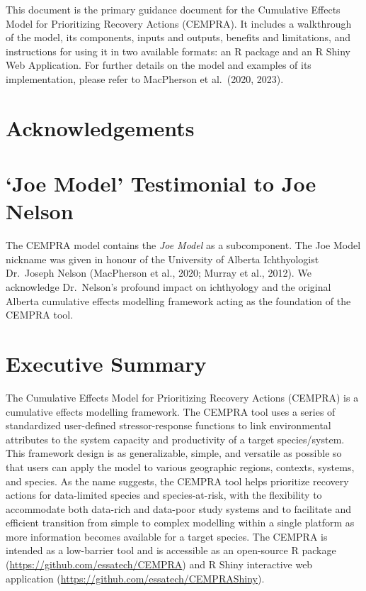 \documentclass[
  letterpaper,
  DIV=11,
  numbers=noendperiod]{scrreprt}
\begin{document}

This document is the primary guidance document for the Cumulative
Effects Model for Prioritizing Recovery Actions (CEMPRA). It includes a
walkthrough of the model, its components, inputs and outputs, benefits
and limitations, and instructions for using it in two available formats:
an R package and an R Shiny Web Application. For further details on the
model and examples of its implementation, please refer to MacPherson et
al.~(2020, 2023).

\hypertarget{acknowledgements}{%
\section*{Acknowledgements}\label{acknowledgements}}


\hypertarget{joe-model-testimonial-to-joe-nelson}{%
\section*{`Joe Model' Testimonial to Joe
Nelson}\label{joe-model-testimonial-to-joe-nelson}}


The CEMPRA model contains the \emph{Joe Model} as a subcomponent. The
Joe Model nickname was given in honour of the University of Alberta
Ichthyologist Dr.~Joseph Nelson (MacPherson et al., 2020; Murray et al.,
2012). We acknowledge Dr.~Nelson's profound impact on ichthyology and
the original Alberta cumulative effects modelling framework acting as
the foundation of the CEMPRA tool.

\hypertarget{executive-summary}{%
\section*{Executive Summary}\label{executive-summary}}


The Cumulative Effects Model for Prioritizing Recovery Actions (CEMPRA)
is a cumulative effects modelling framework. The CEMPRA tool uses a
series of standardized user-defined stressor-response functions to link
environmental attributes to the system capacity and productivity of a
target species/system. This framework design is as generalizable,
simple, and versatile as possible so that users can apply the model to
various geographic regions, contexts, systems, and species. As the name
suggests, the CEMPRA tool helps prioritize recovery actions for
data-limited species and species-at-risk, with the flexibility to
accommodate both data-rich and data-poor study systems and to facilitate
and efficient transition from simple to complex modelling within a
single platform as more information becomes available for a target
species. The CEMPRA is intended as a low-barrier tool and is accessible
as an open-source R package (\url{https://github.com/essatech/CEMPRA})
and R Shiny interactive web application
(\url{https://github.com/essatech/CEMPRAShiny}).
\end{document}
